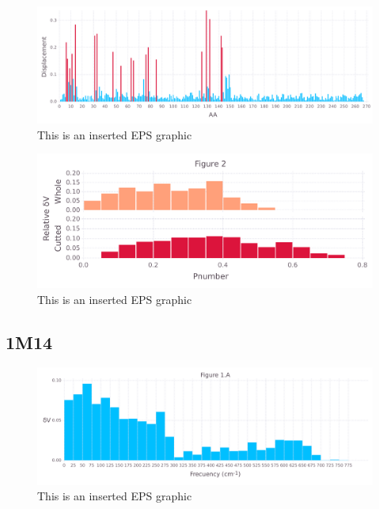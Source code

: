 \documentclass[10pt,letterpaper]{article}
\begin{document}
\begin{figure}[ht]
\begin{center}
\includegraphics[scale=0.5]{1xkk/5figure.pdf}
\caption{This is an inserted EPS graphic}
\label{fig13}
\end{center}
\end{figure}

\begin{figure}[ht]
\begin{center}
\includegraphics[scale=0.5]{1xkk/3_both.pdf}
\caption{This is an inserted EPS graphic}
\label{fig13}
\end{center}
\end{figure}

\FloatBarrier
\newpage

\subsection{1M14}

\begin{figure}[ht]
\begin{center}
\includegraphics[scale=0.5]{1m14/1afigure.pdf}
\caption{This is an inserted EPS graphic}
\label{fig1}
\end{center}
\end{figure}
\end{document}
